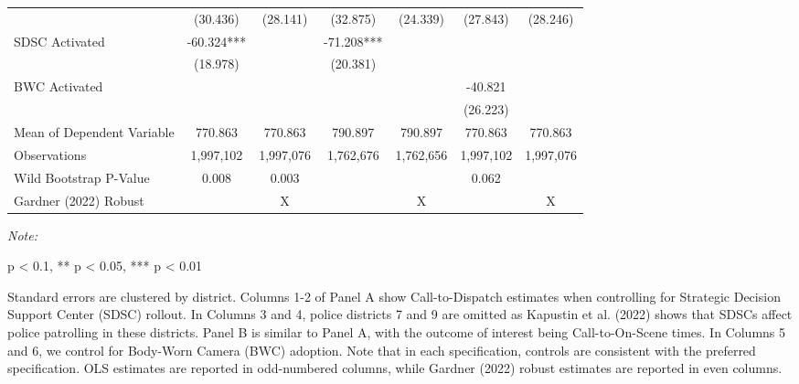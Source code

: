 \begin{table}[H]
\begin{threeparttable}
\begin{tabular}[t]{lcccccc}
\hspace{1em} & (30.436) & (28.141) & (32.875) & (24.339) & (27.843) & (28.246)\\
\hspace{1em}SDSC Activated & -60.324*** &  & -71.208*** &  &  & \\
\hspace{1em} & (18.978) &  & (20.381) &  &  & \\
\hspace{1em}BWC Activated &  &  &  &  & -40.821 & \\
\hspace{1em} &  &  &  &  & (26.223) & \\
\hspace{1em}Mean of Dependent Variable & 770.863 & 770.863 & 790.897 & 790.897 & 770.863 & 770.863\\
\hspace{1em}Observations & 1,997,102 & 1,997,076 & 1,762,676 & 1,762,656 & 1,997,102 & 1,997,076\\
\hspace{1em}Wild Bootstrap P-Value & 0.008 & 0.003 &  &  & 0.062 & \\
\midrule
Gardner (2022) Robust &  & X &  & X &  & X\\
\bottomrule
\end{tabular}
\begin{tablenotes}
\item \textit{Note: } 
\item * p < 0.1, ** p < 0.05, *** p < 0.01
\item Standard errors are clustered by district. Columns 1-2 of Panel A show                       Call-to-Dispatch estimates when controlling for Strategic                      Decision Support Center (SDSC) rollout. In Columns 3 and 4,                       police districts 7 and 9 are omitted as Kapustin et al. (2022) shows that SDSCs                       affect                      police patrolling in these districts. Panel B is similar to Panel A,                      with the outcome of interest being Call-to-On-Scene times. In Columns 5 and 6,                      we control for Body-Worn Camera (BWC) adoption. Note that in each specification,                      controls are consistent with the preferred specification. OLS estimates are reported                      in odd-numbered columns, while Gardner (2022) robust estimates are reported in even columns.                                     
\end{tablenotes}
\end{threeparttable}
\end{table}
